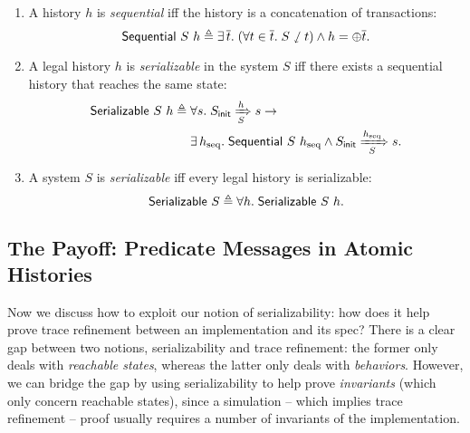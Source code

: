 \documentclass[sigplan,10pt,review,anonymous,screen]{acmart}\settopmatter{printfolios=true,printccs=false,printacmref=false}
\begin{document}
\begin{definition}\mbox{}\vspace{-8pt}\\
  \begin{enumerate}[leftmargin=*]
  \item A history $h$ is \emph{sequential} iff the history is a concatenation of transactions:
    \begin{displaymath}
      \mathsf{Sequential}\ S\ h \triangleq \exists\, \overline{t}.\; (\forall t \in \overline{t}.\; S \sswarrow t) \wedge h = \oplus \overline{t}.
    \end{displaymath}
  \item A legal history $h$ is \emph{serializable} in the system $S$ iff there exists a sequential history that reaches the same state:
    \begin{align*}
      \mathsf{Serializable}\ S\ h \triangleq\; & \forall s.\; S_{\textsf{init}} \xRightarrow[S]{h} s \to\\
      & \exists\, h_{\textrm{seq}}.\; \mathsf{Sequential}\ S\ h_{\textrm{seq}} \wedge S_{\textsf{init}} \xRightarrow[S]{h_{\textrm{seq}}} s.
    \end{align*}
  \item A system $S$ is \emph{serializable} iff every legal history is serializable:
    \begin{displaymath}
      \mathsf{Serializable}\ S \triangleq \forall h.\; \mathsf{Serializable}\ S\ h.
    \end{displaymath}
  \end{enumerate}
\end{definition}

\subsection{The Payoff: Predicate Messages in Atomic Histories}
\label{sec-pred-msg}

Now we discuss how to exploit our notion of serializability: how does it help prove trace refinement between an implementation and its spec?
There is a clear gap between two notions, serializability and trace refinement: the former only deals with \emph{reachable states}, whereas the latter only deals with \emph{behaviors}.
However, we can bridge the gap by using serializability to help prove \emph{invariants} (which only concern reachable states), since a simulation -- which implies trace refinement -- proof usually requires a number of invariants of the implementation.
\end{document}
